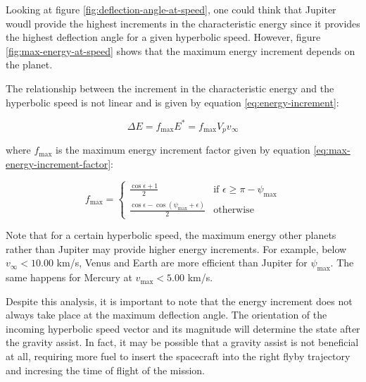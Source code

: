 Looking at figure \ref{fig:deflection-angle-at-speed}, one could think that
Jupiter woudl provide the highest increments in the characteristic energy since
it provides the highest deflection angle for a given hyperbolic speed. However,
figure \ref{fig:max-energy-at-speed} shows that the maximum energy increment
depends on the planet.

The relationship between the increment in the characteristic energy and the
hyperbolic speed is not linear and is given by equation
\ref{eq:energy-increment}:

\begin{equation}
        \Delta E = f_{\text{max}} E^{\ast} = f_{\text{max}} V_p v_{\infty}
        \label{eq:energy-increment}
\end{equation}

where $f_{\text{max}}$ is the maximum energy increment factor given by equation
\ref{eq:max-energy-increment-factor}:

%

\begin{equation}
        f_{\text{max}} = \begin{cases}
            \frac{\cos{\epsilon} + 1}{2} & \text{if } \epsilon \geq \pi - \psi_{\max} \\
            \frac{\cos{\epsilon} - \cos{\left(\psi_{\max} + \epsilon\right)}}{2} & \text{otherwise}
        \end{cases}
        \label{eq:max-energy-increment-factor}
\end{equation}
 
Note that for a certain hyperbolic speed, the maximum energy other planets
rather than Jupiter may provide higher energy increments. For example, below
$v_{\infty} < 10.00$ km/s, Venus and Earth are more efficient than Jupiter for
$\psi_{\text{max}}$. The same happens for Mercury at $v_{\text{max}} < 5.00$
km/s.

Despite this analysis, it is important to note that the energy increment does
not always take place at the maximum deflection angle. The orientation of the
incoming hyperbolic speed vector and its magnitude will determine the state
after the gravity assist. In fact, it may be possible that a gravity assist is
not beneficial at all, requiring more fuel to insert the spacecraft into the
right flyby trajectory and incresing the time of flight of the mission.
